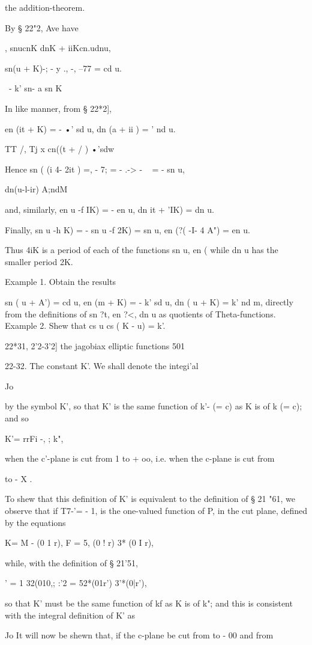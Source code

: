 the addition-theorem.

By § 22"2, Ave have

, snucnK dnK + iiKcn.udnu,

sn(u + K)-; - y ., -, --77 = cd u.

  \ - k' sn- a sn K

In like manner, from § 22*2],

en (it + K) = - •' sd u, dn (a + ii ) = ' nd u.

TT /, Tj x cn((t + / ) •'sdw

Hence sn ( (i 4- 2it ) =, - 7; = - .-> - ~ = - sn u,

  dn(u-l-ir) A;ndM

and, similarly, en u -f IK) = - en u, dn it + 'IK) = dn u.

Finally, sn u -h K) = - sn u -f 2K) = sn u, en (?( -I- 4 A") = en u.

Thus 4iK is a period of each of the functions sn u, en ( while dn u
has the smaller period 2K.

Example 1. Obtain the results

sn ( u + A') = cd u, en (m + K) = - k' sd u, dn ( u + K) = k' nd m,
directly from the definitions of sn ?t, en ?<, dn u as quotients of
Theta-functions. Example 2. Shew that cs u cs ( K - u) = k'.

22*31, 2'2-3'2] the jagobiax elliptic functions 501

22-32. The constant K'. We shall denote the integi'al

Jo

by the symbol K', so that K' is the same function of k'- (= c) as K is
of k (= c); and so

K'= rrFi -, ; k",

when the c'-plane is cut from 1 to + oo, i.e. when the c-plane is cut
from

to - X .

To shew that this definition of K' is equivalent to the definition of
§ 21 "61, we observe that if T7-'= - 1, is the one-valued function of
P, in the cut plane, defined by the equations

K= M - (0 1 r), F = 5, (0 ! r) 3* (0 I r),

while, with the definition of § 21'51,

 ' = 1 32(010,; :'2 = 52*(01r') 3'*(0|r'),

so that K' must be the same function of kf as K is of k"; and this is
consistent with the integral definition of K' as

Jo It will now be shewn that, if the c-plane be cut from to - 00 and
from

